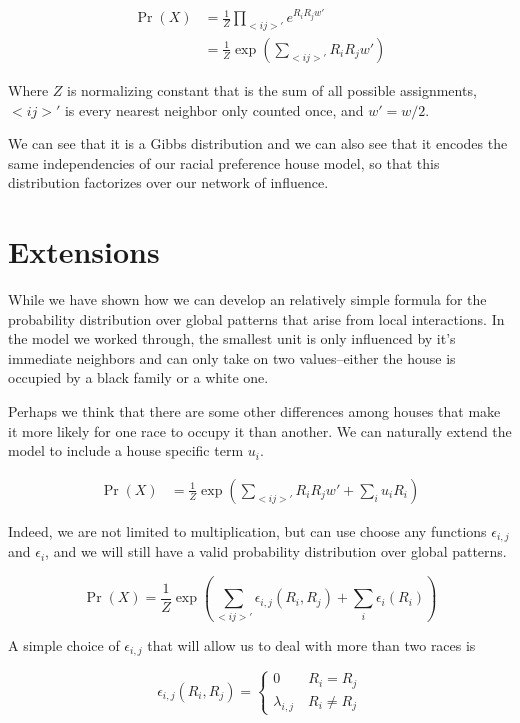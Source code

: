 \documentclass{article}
\begin{document}
\begin{align}
\Pr(X) &= \frac{1}{Z}\prod_{<i j>'}e^{R_iR_jw'} \\
&= \frac{1}{Z}\operatorname{exp}(\sum_{<i j>'}R_iR_jw') 
\end{align}

Where $Z$ is normalizing constant that is the sum of all possible assignments, 
$<i j>'$ is every nearest neighbor only counted once, and $w' = w/2$.

We can see that it is a Gibbs distribution and we can also see that it
encodes the same independencies of our racial preference house model,
so that this distribution factorizes over our network of influence.

\section{Extensions}
While we have shown how we can develop an relatively simple formula
for the probability distribution over global patterns that arise from
local interactions. In the model we worked through, the smallest unit
is only influenced by it's immediate neighbors and can only take on
two values--either the house is occupied by a black family or a white
one. 

Perhaps we think that there are some other differences among houses
that make it more likely for one race to occupy it than another.
We can naturally extend the model to include a house specific term $u_i$.

\begin{align}
\Pr(X) &= \frac{1}{Z}\operatorname{exp}(\sum_{<i j>'}R_iR_jw' + \sum_iu_iR_i) 
\end{align}

Indeed, we are not limited to multiplication, but can use choose any
functions $\epsilon_{i,j}$ and $\epsilon_i$, and we will still have a valid 
probability distribution over global patterns.

\begin{equation}
\Pr(X) = \frac{1}{Z}\operatorname{exp}(\sum_{<i j>'}\epsilon_{i,j}(R_i,R_j) + \sum_i\epsilon_i(R_i)) 
\end{equation}

A simple choice of $\epsilon_{i,j}$ that will allow us to deal with
more than two races is

\begin{equation}
\epsilon_{i,j}(R_i,R_j) = \begin{cases}
  0 \quad\quad R_i = R_j \\
  \lambda_{i,j} \quad R_i \neq R_j
\end{cases}
\end{equation}
\end{document}
